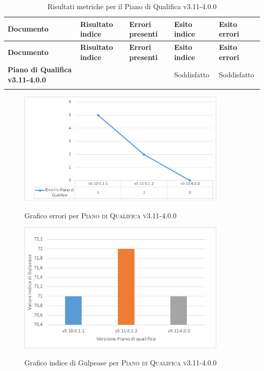 \renewcommand{\arraystretch}{2} %
\begin{longtable}[H]{>{\centering\bfseries}m{6cm} >{\centering}m{2cm} >{\centering}m{2.5cm} >{\centering}m{2.5cm} >{\centering\arraybackslash}m{2.5cm}}  
  \rowcolor{lightgray}
  {\textbf{Documento}} & {\textbf{Risultato indice}} & {\textbf{Errori presenti}} & {\textbf{Esito indice}} & {\textbf{Esito errori}}  \\
  \endfirsthead%
  \rowcolor{lightgray}
  {\textbf{Documento}} & {\textbf{Risultato indice}} & {\textbf{Errori presenti}} & {\textbf{Esito indice}} & {\textbf{Esito errori}}  \\
  \endhead%
  \textbf{Piano di Qualifica v3.11-4.0.0} & 72              & 0               & Soddisfatto & Soddisfatto \\
  \caption{Risultati metriche per il Piano di Qualifica v3.11-4.0.0}
  \label{tab:my-table}
\end{longtable}

\begin{figure}[H]
  \centering
  \includegraphics[width=10cm]{img/erroriPdQv3.11-4.0.0.png}
  \label{fig:errori_pdq}
  \caption{Grafico errori per \textsc{Piano di Qualifica v3.11-4.0.0}}
\end{figure}

\begin{figure}[H]
  \centering
  \includegraphics[width=10cm]{img/GulpeasePdQv3.11-4.0.0.png}
  \label{fig:gulpease_pdq}
  \caption{Grafico indice di Gulpease per \textsc{Piano di Qualifica v3.11-4.0.0}}
\end{figure}


